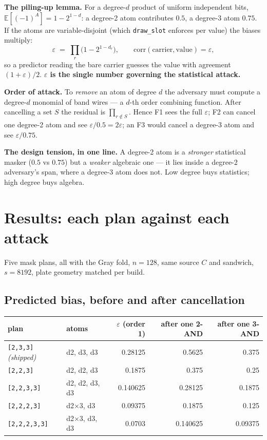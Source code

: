 \documentclass[11pt]{article}
\newcommand{\code}[1]{\texttt{#1}}
\begin{document}
\textbf{The piling-up lemma.} For a degree-$d$ product of uniform independent
bits, $\mathbb{E}[(-1)^{A}] = 1 - 2^{1-d}$: a degree-2 atom contributes $0.5$, a
degree-3 atom $0.75$. If the atoms are variable-disjoint (which \code{draw\_slot}
enforces per value) the biases multiply:
\[
  \varepsilon \;=\; \prod_r \bigl(1 - 2^{1-d_r}\bigr), \qquad
  \mathrm{corr}(\text{carrier}, \text{value}) = \varepsilon,
\]
so a predictor reading the bare carrier guesses the value with agreement
$(1+\varepsilon)/2$. \textbf{$\varepsilon$ is the single number governing the
statistical attack.}

\textbf{Order of attack.} To \emph{remove} an atom of degree $d$ the adversary
must compute a degree-$d$ monomial of band wires --- a $d$-th order combining
function. After cancelling a set $S$ the residual is $\prod_{r \notin S}$. Hence
F1 sees the full $\varepsilon$; F2 can cancel one degree-2 atom and see
$\varepsilon/0.5 = 2\varepsilon$; an F3 would cancel a degree-3 atom and see
$\varepsilon/0.75$.

\textbf{The design tension, in one line.} A degree-2 atom is a \emph{stronger}
statistical masker ($0.5$ vs $0.75$) but a \emph{weaker} algebraic one --- it
lies inside a degree-2 adversary's span, where a degree-3 atom does not. Low
degree buys statistics; high degree buys algebra.

\section{Results: each plan against each attack}

Five mask plans, all with the Gray fold, $n{=}128$, same source $C$ and sandwich,
$s = 8192$, plate geometry matched per build.

\subsection{Predicted bias, before and after cancellation}

\begin{center}
\begin{tabular}{llrrr}
\toprule
plan & atoms & $\varepsilon$ (order 1) & after one 2-AND & after one 3-AND \\
\midrule
\code{[2,3,3]} \emph{(shipped)} & d2, d3, d3 & 0.28125 & 0.5625 & 0.375 \\
\code{[2,2,3]}     & d2, d2, d3       & 0.1875  & 0.375   & 0.25 \\
\code{[2,2,3,3]}   & d2, d2, d3, d3   & 0.140625& 0.28125 & 0.1875 \\
\code{[2,2,2,3]}   & d2$\times$3, d3  & 0.09375 & 0.1875  & 0.125 \\
\code{[2,2,2,3,3]} & d2$\times$3, d3, d3 & 0.0703 & 0.140625 & 0.09375 \\
\bottomrule
\end{tabular}
\end{center}
\end{document}
